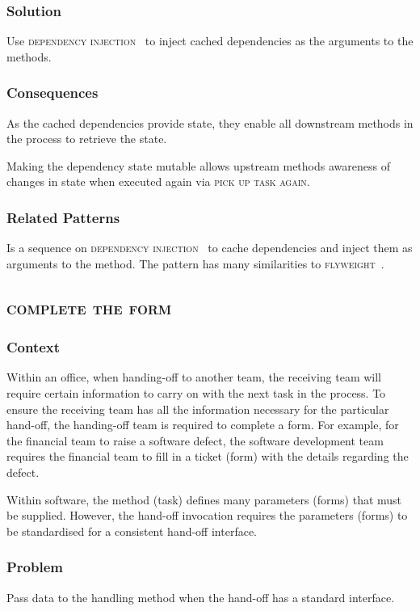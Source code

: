 \documentclass[prodmode]{style/acmlarge}
\begin{document}
\subsubsection*{\textbf{Solution}} Use \textsc{dependency injection}~\cite{ioc}
to inject cached dependencies as the arguments to the methods.

\subsubsection*{Consequences} As the cached dependencies provide state, they
enable all downstream methods in the process to retrieve the state.

Making the dependency state mutable allows upstream methods awareness of changes
in state when executed again via \textsc{pick up task again}.

\subsubsection*{Related Patterns} Is a sequence on \textsc{dependency
injection}~\cite{ioc} to cache dependencies and inject them as arguments to the
method.  The pattern has many similarities to \textsc{flyweight}~\cite{gof}.



\subsection{\textsc{\textbf{complete the form}}}

\subsubsection*{Context} Within an office, when handing-off to another team, the
receiving team will require certain information to carry on with the next task
in the process.  To ensure the receiving team has all the information necessary
for the particular hand-off, the handing-off team is required to complete a
form.  For example, for the financial team to raise a software defect, the
software development team requires the financial team to fill in a ticket (form)
with the details regarding the defect.

Within software, the method (task) defines many parameters (forms) that must be
supplied.  However, the hand-off invocation requires the parameters (forms) to
be standardised for a consistent hand-off interface.

\subsubsection*{\textbf{Problem}} Pass data to the handling method when the hand-off has
a standard interface.
\end{document}
